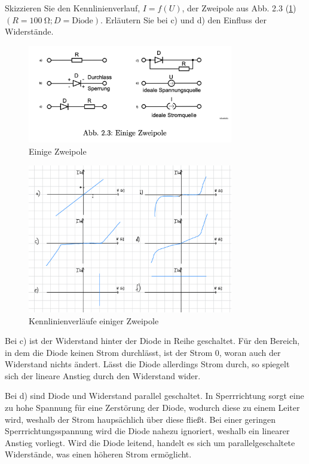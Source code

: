 \documentclass{article}
\theoremstyle{definition}
\begin{document}
\begin{voraufgabe}{Skizzieren Sie den Kennlinienverlauf, $I=f(U)$, der Zweipole aus Abb. 2.3 (\ref{fig:Abb2.3}) $(R = \SI{100}{\ohm}; D = \text{Diode})$. Erläutern Sie bei c) und d) den Einfluss der Widerstände.}
    \begin{figure}[H]
        \centering
        \includegraphics[width=0.8\textwidth]{figs/fig2_3.png}
        \caption{Einige Zweipole\cite{anleitung}}
        \label{fig:Abb2.3}
    \end{figure}
    \begin{figure}[H]
        \centering
        \includegraphics[width=0.8\textwidth]{figs/fig2_C.png}
        \caption{Kennlinienverläufe einiger Zweipole}
        \label{figC}
    \end{figure}
    Bei c) ist der Widerstand hinter der Diode in Reihe geschaltet. Für den Bereich, in dem die Diode keinen Strom durchlässt, ist der Strom $0$, woran auch der Widerstand nichts ändert. Lässt die Diode allerdings Strom durch, so spiegelt sich der lineare Anstieg durch den Widerstand wider.

    Bei d) sind Diode und Widerstand parallel geschaltet. In Sperrrichtung sorgt eine zu hohe Spannung für eine Zerstörung der Diode, wodurch diese zu einem Leiter wird, weshalb der Strom haupsächlich über diese fließt. Bei einer geringen Sperrrichtungsspannung wird die Diode nahezu ignoriert, weshalb ein linearer Anstieg vorliegt. Wird die Diode leitend, handelt es sich um parallelgeschaltete Widerstände, was einen höheren Strom ermöglicht.

\end{voraufgabe}
\end{document}

